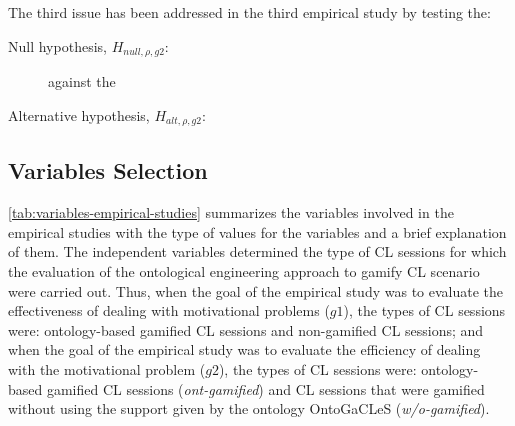 The third issue  has been addressed in the third empirical study by testing the:

\begin{description}
\item[Null hypothesis, $H_{null,\rho,g2}$:]  against the
\item[Alternative hypothesis, $H_{alt,\rho,g2}$:] 
\end{description}


\subsection{Variables Selection}

\autoref{tab:variables-empirical-studies} summarizes the variables involved in the empirical studies with the type of values for the variables and a brief explanation of them. The independent variables  determined the type of CL sessions for which the evaluation of the ontological engineering approach to gamify CL scenario were carried out. Thus, when the goal of the empirical study was to evaluate the effectiveness of dealing with motivational problems ($g1$), the types of CL sessions were: ontology-based gamified CL sessions and non-gamified CL sessions; and when the goal of the empirical study was to evaluate the efficiency of dealing with the motivational problem ($g2$), the types of CL sessions were: ontology-based gamified CL sessions (\emph{ont-gamified}) and CL sessions that were gamified without using the support given by the ontology OntoGaCLeS (\emph{w/o-gamified}).

